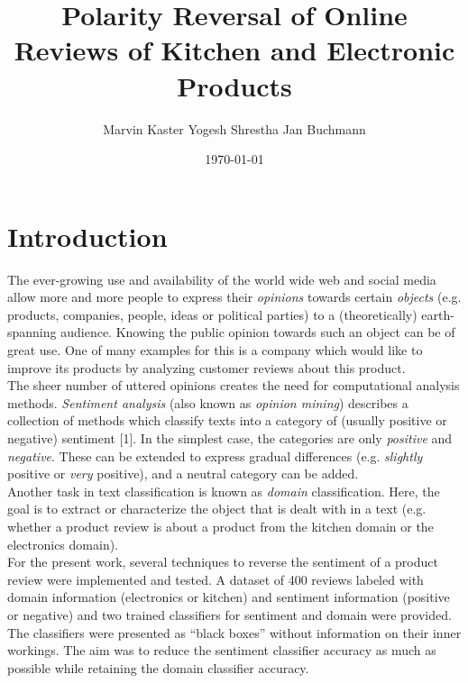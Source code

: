 \documentclass[11pt,a4paper]{article}
\title{Polarity Reversal of Online Reviews of Kitchen and Electronic Products}
\author{Marvin Kaster \And Yogesh Shrestha \And Jan Buchmann}
\date{\today}
\begin{document}
\maketitle


\section{Introduction}
The ever-growing use and availability of the world wide web and social media allow more and more people to express their \textit{opinions} towards certain \textit{objects} (e.g. products, companies, people, ideas or political parties) to a (theoretically) earth-spanning audience. Knowing the public opinion towards such an object can be of great use. One of many examples for this is a company which would like to improve its products by analyzing customer reviews about this product.\\
The sheer number of uttered opinions creates the need for computational analysis methods. \textit{Sentiment analysis} (also known as \textit{opinion mining}) describes a collection of methods which classify texts into a category of (usually positive or negative) sentiment [1]. In the simplest case, the categories are only \textit{positive} and \textit{negative}. These can be extended to express gradual differences (e.g. \textit{slightly} positive or \textit{very} positive), and a neutral category can be added.\\
Another task in text classification is known as \textit{domain} classification. Here, the goal is to extract or characterize the object that is dealt with in a text (e.g. whether a product review is about a product from the kitchen domain or the electronics domain). \\
For the present work, several techniques   to reverse the sentiment of a product review were implemented and tested. A dataset of 400 reviews labeled with domain information (electronics or kitchen) and sentiment information (positive or negative) and two trained classifiers for sentiment and domain were provided. The classifiers were presented as “black boxes” without information on their inner workings. The aim was to reduce the sentiment classifier accuracy as much as possible while retaining the domain classifier accuracy.
\end{document}
